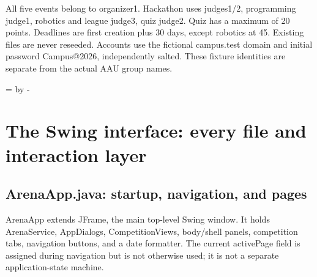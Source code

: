 \documentclass[12pt]{article}
\newcommand{\topic}[1]{\needroom{9\baselineskip}\section{#1}}
\newcommand{\needroom}[1]{\par\begingroup\dimen0=\pagegoal\advance\dimen0 by -\pagetotal\ifdim\dimen0<#1\newpage\fi\endgroup}
\begin{document}
All five events belong to organizer1. Hackathon uses judges1/2, programming judge1, robotics and league judge3, quiz judge2. Quiz has a maximum of 20 points. Deadlines are first creation plus 30 days, except robotics at 45. Existing files are never reseeded. Accounts use the fictional campus.test domain and initial password Campus@2026, independently salted. These fixture identities are separate from the actual AAU group names.

\topic{The Swing interface: every file and interaction layer}
\subsection{ArenaApp.java: startup, navigation, and pages}
ArenaApp extends JFrame, the main top-level Swing window. It holds ArenaService, AppDialogs, CompetitionViews, body/shell panels, competition tabs, navigation buttons, and a date formatter. The current activePage field is assigned during navigation but is not otherwise used; it is not a separate application-state machine.
\end{document}
